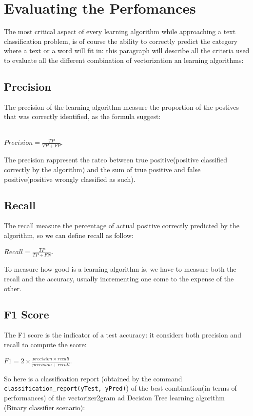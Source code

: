 \documentclass{article}
\begin{document}
\section{Evaluating the Perfomances}
The most critical aspect of every learning algorithm while approaching a text classification problem, is of course the ability to correctly predict the category where a text or a word will fit in: this paragraph will describe all the criteria used to evaluate all the different combination of vectorization an learning algorithms:

\subsection{Precision}
The precision of the learning algorithm measure the proportion of the postives that was correctly identified, as the formula suggest:\\\\	
 
 \begin{center}
$Precision =\frac{TP}{TP+FP}. $
\end{center}
The precision rappresent the rateo between true positive(positive classified correctly by the algorithm) and the sum of true positive and false positive(positive wrongly classified as such).

\subsection{Recall}
The recall measure the percentage of actual positive correctly predicted by the algorithm, so we can define recall as follow:

  \begin{center}
$Recall =\frac{TP}{TP+FN}. $
\end{center}
To measure how good is a learning algorithm is, we have to measure both the recall and the accuracy, usually incrementing one come to the expense of the other.\\

\subsection{F1 Score}
The F1 score is the indicator of a test accuracy: it considers both precision and recall to compute the score:\\

  \begin{center}
 $F1 =2\times \frac{precision\times recall}{precision+recall}. $
 \end{center}
 \clearpage
So here is a classification report 
(obtained by the command \verb|classification_report(yTest, yPred)|) of the best combination(in terms of performances) of the vectorizer2gram ad Decision Tree learning algorithm (Binary classifier scenario):\\
 
\end{document}
